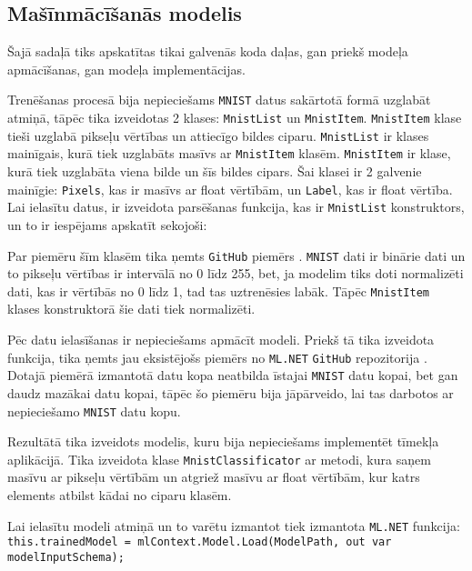 \subsection{Mašīnmācīšanās modelis}

    Šajā sadaļā tiks apskatītas tikai galvenās koda daļas, gan priekš
    modeļa apmācīšanas, gan modeļa implementācijas.

    Trenēšanas procesā bija nepieciešams \texttt{MNIST} datus sakārtotā formā uzglabāt atmiņā, tāpēc
    tika izveidotas 2 klases: \texttt{MnistList} un \texttt{MnistItem}. \texttt{MnistItem} klase tieši
    uzglabā pikseļu vērtības un attiecīgo bildes ciparu. \texttt{MnistList} ir klases mainīgais, kurā
    tiek uzglabāts masīvs ar \texttt{MnistItem} klasēm. \texttt{MnistItem} ir klase, kurā tiek uzglabāta
    viena bilde un šīs bildes cipars. Šai klasei ir 2 galvenie mainīgie: \texttt{Pixels}, kas ir masīvs
    ar float vērtībām, un \texttt{Label}, kas ir float vērtība. Lai ielasītu datus, ir izveidota parsēšanas
    funkcija, kas ir \texttt{MnistList} konstruktors, un to ir iespējams apskatīt sekojoši:

    

    Par piemēru šīm klasēm tika ņemts \texttt{GitHub} piemērs \cite{paxbunPaxbunCntkMnistPractice2019}.
    \texttt{MNIST} dati ir binārie dati un to pikseļu vērtības ir intervālā no 0 līdz 255,
    bet, ja modelim tiks doti normalizēti dati, kas ir vērtībās no 0 līdz 1, tad tas
    uztrenēsies labāk. Tāpēc \texttt{MnistItem} klases konstruktorā šie dati tiek
    normalizēti.

    

    Pēc datu ielasīšanas ir nepieciešams apmācīt modeli. Priekš tā tika izveidota funkcija, tika ņemts jau eksistējošs piemērs no \texttt{ML.NET} \texttt{GitHub}
    repozitorija \cite{DotnetMachinelearningsamples2021}. Dotajā piemērā izmantotā datu kopa
    neatbilda īstajai \texttt{MNIST} datu kopai, bet gan daudz mazākai datu kopai, tāpēc šo piemēru bija
    jāpārveido, lai tas darbotos ar nepieciešamo \texttt{MNIST} datu kopu. \cite{MNISTHandwrittenDigit}

    

    Rezultātā tika izveidots modelis, kuru bija nepieciešams implementēt tīmekļa aplikācijā.
    Tika izveidota klase \texttt{MnistClassificator} ar metodi, kura saņem masīvu ar pikseļu vērtībām un
     atgriež masīvu ar float vērtībām, kur katrs elements
    atbilst kādai no ciparu klasēm.

    

    Lai ielasītu modeli atmiņā un to varētu izmantot tiek izmantota \texttt{ML.NET} funkcija:
    \texttt{this.trainedModel = mlContext.Model.Load(ModelPath, out var modelInputSchema);}
